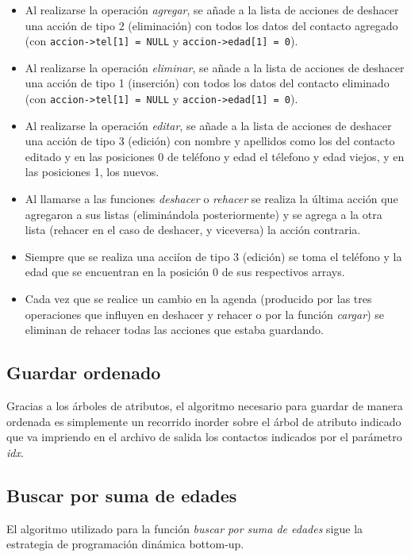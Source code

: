 \documentclass[11pt]{article}
\begin{document}
    \begin{itemize}
      \item Al realizarse la operaci\'on \emph{agregar}, se a\~{n}ade a la lista de acciones de deshacer una acci\'on de tipo 2 (eliminaci\'on) con todos los datos del contacto agregado (con \verb|accion->tel[1] = NULL| y \verb|accion->edad[1] = 0|).
      \item Al realizarse la operaci\'on \emph{eliminar}, se a\~{n}ade a la lista de acciones de deshacer una acci\'on de tipo 1 (inserci\'on) con todos los datos del contacto eliminado (con \verb|accion->tel[1] = NULL| y \verb|accion->edad[1] = 0|).
      \item Al realizarse la operaci\'on \emph{editar}, se a\~{n}ade a la lista de acciones de deshacer una acci\'on de tipo 3 (edici\'on) con nombre y apellidos como los del contacto editado y en las posiciones 0 de tel\'efono y edad el t\'elefono y edad viejos, y en las posiciones 1, los nuevos.
      \item Al llamarse a las funciones \emph{deshacer} o \emph{rehacer} se realiza la \'ultima acci\'on que agregaron a sus listas (elimin\'andola posteriormente) y se agrega a la otra lista (rehacer en el caso de deshacer, y viceversa) la acci\'on contraria.
      \item Siempre que se realiza una acci\'ion de tipo 3 (edici\'on) se toma el tel\'efono y la edad que se encuentran en la posici\'on 0 de sus respectivos arrays.
      \item Cada vez que se realice un cambio en la agenda (producido por las tres operaciones que influyen en deshacer y rehacer o por la funci\'on \emph{cargar}) se eliminan de rehacer todas las acciones que estaba guardando. 
    \end{itemize}

    \subsection{Guardar ordenado}
    Gracias a los \'arboles de atributos, el algoritmo necesario para guardar de manera ordenada es simplemente un recorrido inorder sobre el \'arbol de atributo indicado que va impriendo en el archivo de salida los contactos indicados por el par\'ametro \emph{idx}.

    \subsection{Buscar por suma de edades}
    El algoritmo utilizado para la funci\'on \emph{buscar por suma de edades} sigue la estrategia de programaci\'on din\'amica bottom-up. 
\end{document}
